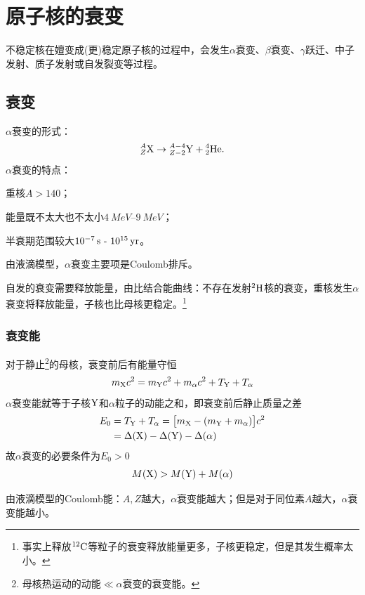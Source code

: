 \chapter{原子核的衰变}
不稳定核在嬗变成(更)稳定原子核的过程中，会发生$\alpha$衰变、$\beta$衰变、$\gamma$跃迁、中子发射、质子发射或自发裂变等过程。

\section{\textalpha 衰变}

$\alpha$衰变的形式：
\begin{align}
	{^A_Z\mathrm{X}} \to {^{A-4}_{Z-2}\mathrm{Y}} + {^4_2\mathrm{He}}.
\end{align}
$\alpha$衰变的特点：
\begin{compactenum}
	\item 重核$A>140$；
	\item 能量既不太大也不太小$\SIrange{4}{9}{MeV}$；
	\item 半衰期范围较大$\SI{e-7}{s}~\text{-}~\SI{e15}{yr}$。
\end{compactenum}
由液滴模型，$\alpha$衰变主要项是Coulomb排斥。

自发的衰变需要释放能量，由比结合能曲线：不存在发射${^{2}\mathrm{H}}$核的衰变，重核发生$\alpha$衰变将释放能量，子核也比母核更稳定。\footnote{事实上释放${^{12}\mathrm{C}}$等粒子的衰变释放能量更多，子核更稳定，但是其发生概率太小。}

\subsection{\textalpha 衰变能}

对于静止\footnote{母核热运动的动能$\ll\alpha$衰变的衰变能。}的母核，衰变前后有能量守恒
\[
	m_{\mathrm{X}}c^2=m_{\mathrm{Y}}c^2+m_\alpha c^2+T_{\mathrm{Y}}+T_\alpha
\]
$\alpha$衰变能就等于子核$\mathrm{Y}$和$\alpha$粒子的动能之和，即衰变前后静止质量之差
\begin{align}
	E_0&=T_{\mathrm{Y}}+T_\alpha=\bigl[m_{\mathrm{X}}-(m_{\mathrm{Y}}+m_\alpha)\bigr]c^2\\\notag
	&=\Delta(\mathrm{X})-\Delta(\mathrm{Y})-\Delta(\alpha)
\end{align}
故$\alpha$衰变的必要条件为$E_0>0$
\[
	M(\mathrm{X})>M(\mathrm{Y})+M(\alpha)
\]

由液滴模型的Coulomb能：$A,Z$越大，$\alpha$衰变能越大；但是对于同位素$A$越大，$\alpha$衰变能越小。

